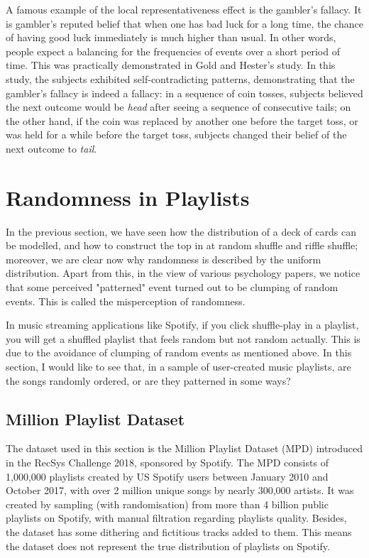 \documentclass[12pt]{article}
\theoremstyle{plain}
\theoremstyle{definition}
\theoremstyle{remark}
\begin{document}
A famous example of the local representativeness effect is the gambler's fallacy. It is gambler's reputed belief that when one has bad luck for a long time, the chance of having good luck immediately is much higher than usual. In other words, people expect a balancing for the frequencies of events over a short period of time. This was practically demonstrated in Gold and Hester's\cite[437]{1.2} study. In this study, the subjects exhibited self-contradicting patterns, demonstrating that the gambler's fallacy is indeed a fallacy: in a sequence of coin tosses, subjects believed the next outcome would be \textit{head} after seeing a sequence of consecutive tails; on the other hand, if the coin was replaced by another one before the target toss, or was held for a while before the target toss, subjects changed their belief of the next outcome to \textit{tail}. 


\newpage


\section{Randomness in Playlists}
In the previous section, we have seen how the distribution of a deck of cards can be modelled, and how to construct the top in at random shuffle and riffle shuffle; moreover, we are clear now why randomness is described by the uniform distribution. Apart from this, in the view of various psychology papers, we notice that some perceived "patterned" event turned out to be clumping of random events. This is called the misperception of randomness.

In music streaming applications like Spotify, if you click shuffle-play in a playlist, you will get a shuffled playlist that feels random but not random actually\cite{2.0}. This is due to the avoidance of clumping of random events as mentioned above. In this section, I would like to see that, in a sample of user-created music playlists, are the songs randomly ordered, or are they patterned in some ways? 

\subsection{Million Playlist Dataset}
The dataset used in this section is the Million Playlist Dataset (MPD) introduced in the RecSys Challenge 2018\cite{2.2}, sponsored by Spotify. The MPD consists of 1,000,000 playlists created by US Spotify users between January 2010 and October 2017, with over 2 million unique songs by nearly 300,000 artists. It was created by sampling (with randomisation) from more than 4 billion public playlists on Spotify, with manual filtration regarding playlists quality. Besides, the dataset has some dithering and fictitious tracks added to them. This means the dataset does not represent the true distribution of playlists on Spotify.\cite{2.1} 
\end{document}
